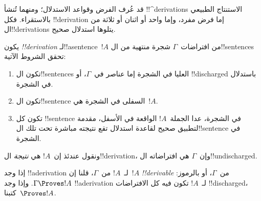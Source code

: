 \documentclass[../../../include/open-logic-section]{subfiles}
\begin{document}
      {}
      {}


\begin{explain}
قد عُرف الفرض وقواعد الاستدلال؛ ومنهما تُنشأ
!!^{derivation}s الاستنتاج الطبيعي بالاستقراء.
فكل !!{derivation} إما فرض مفرد، وإما واحد أو اثنان أو ثلاثة من ال!!{derivation}s يتلوها استدلال صحيح.
\end{explain}

\begin{defn}[!!^{derivation}]
يكون  \emph{!!{derivation}} لـ!!a{sentence}~$!A$
من افتراضات~$\Gamma$ شجرة منتهية من ال!!{sentence}s تحقق الشروط الآتية:
\begin{enumerate}
\item تكون ال!!{sentence}s العليا في الشجرة إما عناصر في~$\Gamma$، أو
  !!{discharged} باستدلال في الشجرة.
\item تكون ال!!{sentence} السفلى في الشجرة هي~$!A$.
\item تكون كل !!{sentence} في الشجرة، عدا الجملة~$!A$ الواقعة في
  الأسفل، مقدمة لتطبيق صحيح لقاعدة استدلال تقع نتيجته مباشرة تحت تلك
  ال!!{sentence} في الشجرة.
\end{enumerate}
ونقول عندئذ إن~$!A$ هي \emph{نتيجة} ال!!{derivation}، وإن~$\Gamma$ هي
افتراضاته ال!!{undischarged}.

إذا وجد !!a{derivation} لـ~$!A$ من~$\Gamma$، قلنا إن~$!A$
\emph{!!{derivable}} من~$\Gamma$، أو بالرموز: $\Gamma \Proves !A$.
وإذا وجد !!a{derivation} لـ~$!A$ تكون فيه كل الافتراضات
!!{discharged}، كتبنا~$\Proves !A$.
\end{defn}
\end{document}
